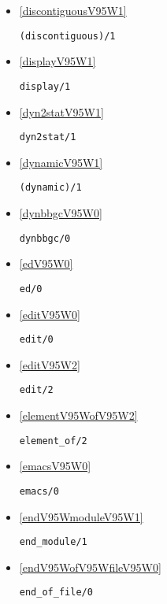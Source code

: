 \begin{itemize}
\item \ref{discontiguousV95W1} 
\begin{verbatim}
(discontiguous)/1
\end{verbatim}

\item \ref{displayV95W1} 
\begin{verbatim}
display/1
\end{verbatim}

\item \ref{dyn2statV95W1} 
\begin{verbatim}
dyn2stat/1
\end{verbatim}

\item \ref{dynamicV95W1} 
\begin{verbatim}
(dynamic)/1
\end{verbatim}

\item \ref{dynbbgcV95W0} 
\begin{verbatim}
dynbbgc/0
\end{verbatim}

\item \ref{edV95W0} 
\begin{verbatim}
ed/0
\end{verbatim}

\item \ref{editV95W0} 
\begin{verbatim}
edit/0
\end{verbatim}

\item \ref{editV95W2} 
\begin{verbatim}
edit/2
\end{verbatim}

\item \ref{elementV95WofV95W2} 
\begin{verbatim}
element_of/2
\end{verbatim}

\item \ref{emacsV95W0} 
\begin{verbatim}
emacs/0
\end{verbatim}

\item \ref{endV95WmoduleV95W1} 
\begin{verbatim}
end_module/1
\end{verbatim}

\item \ref{endV95WofV95WfileV95W0} 
\begin{verbatim}
end_of_file/0
\end{verbatim}


\end{itemize}
